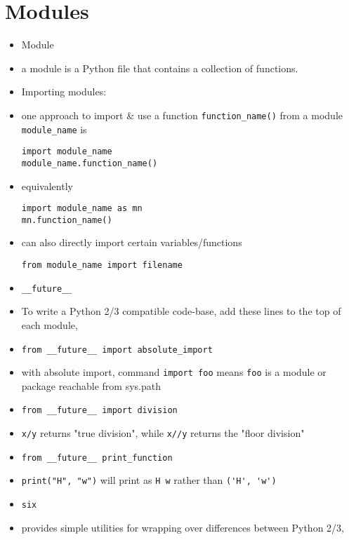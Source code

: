 \documentclass[onecolumn]{IEEEtran} %
\begin{document}
\section{Modules\label{modules_section}}
\begin{itemize}
    \item Module
    \bi
        \item a module is a Python file that contains a collection of functions.
    \ei
    \item Importing modules:
    \bi
        \item one approach to import \& use a function \verb|function_name()| from a module \verb|module_name| is
        \begin{verbatim}
import module_name
module_name.function_name()
        \end{verbatim}
        \item equivalently
        \begin{verbatim}
import module_name as mn
mn.function_name()
        \end{verbatim}
        \item can also directly import certain variables/functions
        \begin{verbatim}
from module_name import filename
        \end{verbatim}
    \ei
    \item \verb|__future__|
    \bi
        \item To write a Python 2/3 compatible code-base, add these lines to the top of each module,
        \item \verb|from __future__ import absolute_import|
        \bi
            \item with absolute import, command \verb|import foo| means \verb|foo| is a module or package reachable from sys.path
        \ei
        \item \verb|from __future__ import division|
        \bi
            \item \verb|x/y| returns "true division", while \verb|x//y| returns the  "floor division"
        \ei
        \item \verb|from __future__ print_function|
        \bi
            \item \verb|print("H", "w")| will print as \verb|H w| rather than \verb|('H', 'w')|
        \ei
    \ei
    \item \verb|six|
    \bi
        \item provides simple utilities for wrapping over differences between Python 2/3,

\end{itemize}
\end{document}
